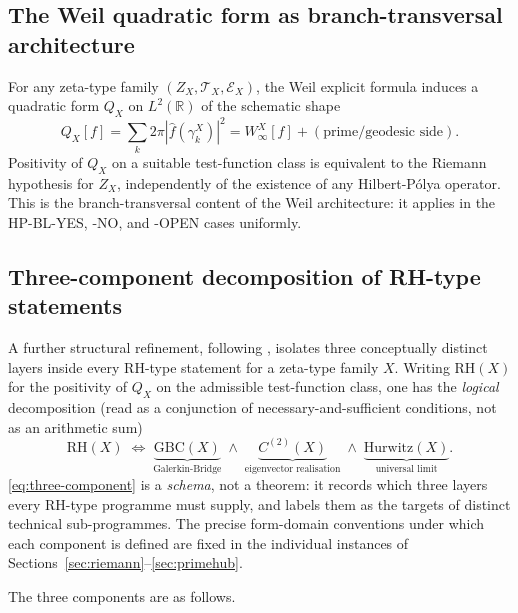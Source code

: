 \documentclass[11pt]{article}
\theoremstyle{definition}
\theoremstyle{remark}
\begin{document}
\subsection{The Weil quadratic form as branch-transversal architecture}
\label{sec:weil-qf}

For any zeta-type family $(Z_X, \mathcal{T}_X, \mathcal{E}_X)$, the
Weil explicit formula \cite{Weil1952} induces a quadratic form $Q_X$
on $L^2(\mathbb{R})$ of the schematic shape
\begin{equation}
\label{eq:weil-qf-generic}
  Q_X[f] = \sum_k 2\pi |\widehat{f}(\gamma_k^X)|^2
    = W^X_\infty[f] + (\text{prime/geodesic side}).
\end{equation}
Positivity of $Q_X$ on a suitable test-function class is equivalent
to the Riemann hypothesis for $Z_X$, independently of the existence
of any Hilbert-P\'olya operator. This is the branch-transversal
content of the Weil architecture: it applies in the HP-BL-YES, -NO,
and -OPEN cases uniformly.

\subsection{Three-component decomposition of RH-type statements}
\label{sec:three-component}

A further structural refinement, following
\cite{MetaGalerkinBridge}, isolates three conceptually distinct
layers inside every RH-type statement for a zeta-type family $X$.
Writing $\mathrm{RH}(X)$ for the positivity of $Q_X$ on the
admissible test-function class, one has the \emph{logical}
decomposition (read as a conjunction of necessary-and-sufficient
conditions, not as an arithmetic sum)
\begin{equation}
\label{eq:three-component}
  \mathrm{RH}(X)
  \;\Longleftrightarrow\;
  \underbrace{\mathrm{GBC}(X)}_{\text{Galerkin-Bridge}}
  \;\wedge\;
  \underbrace{C^{(2)}(X)}_{\text{eigenvector realisation}}
  \;\wedge\;
  \underbrace{\mathrm{Hurwitz}(X)}_{\text{universal limit}}.
\end{equation}
\eqref{eq:three-component} is a \emph{schema}, not a theorem: it
records which three layers every RH-type programme must supply,
and labels them as the targets of distinct technical sub-programmes.
The precise form-domain conventions under which each component is
defined are fixed in the individual instances of
Sections~\ref{sec:riemann}--\ref{sec:primehub}.

The three components are as follows.
\end{document}
